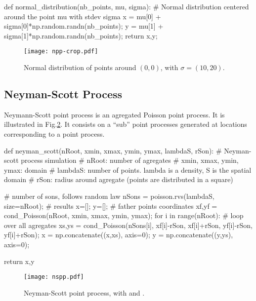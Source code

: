 \begin{python}
def normal_distribution(nb_points, mu, sigma):
    # Normal distribution centered around the point mu with stdev sigma
    x = mu[0] + sigma[0]*np.random.randn(nb_points);
    y = mu[1] + sigma[1]*np.random.randn(nb_points);
    return x,y;
\end{python}

\begin{figure}[H]
 \centering\caption{Normal distribution of points around $(0,0)$, with $\sigma=(10, 20)$.}%
 \texttt{[image: npp-crop.pdf]}%
 \label{fig:point_process_generation:python:npp}%
\end{figure}

\vspace*{-10pt}


\subsection{Neyman-Scott Process}
Neymann-Scott point process is an agregated Poisson point process. It is illustrated in Fig.\ref{fig:point_process_generation:python:nspp}. It consists on a ``sub'' point processes generated at locations corresponding to a point process.

\begin{python}
def neyman_scott(nRoot, xmin, xmax, ymin, ymax, lambdaS, rSon):
    # Neyman-scott process simulation
    # nRoot: number of agregates
    # xmin, xmax, ymin, ymax: domain
    # lambdaS: number of points. lambda is a density, S is the spatial domain
    # rSon: radius around agregate (points are distributed in a square)
    
    # number of sons, follows random law
    nSons = poisson.rvs(lambdaS, size=nRoot);
    # results    
    x=[];
    y=[];
    # father points coordinates
    xf,yf = cond_Poisson(nRoot, xmin, xmax, ymin, ymax);
    for i in range(nRoot):
        # loop over all agregates
        xs,ys = cond_Poisson(nSons[i], xf[i]-rSon, xf[i]+rSon, yf[i]-rSon, yf[i]+rSon);
        x = np.concatenate((x,xs), axis=0);
        y = np.concatenate((y,ys), axis=0);
    
    return x,y
\end{python}

\begin{figure}[H]
 \centering\caption{Neyman-Scott point process, with  and .}%
 \texttt{[image: nspp.pdf]}%
 \label{fig:point_process_generation:python:nspp}%
\end{figure}



